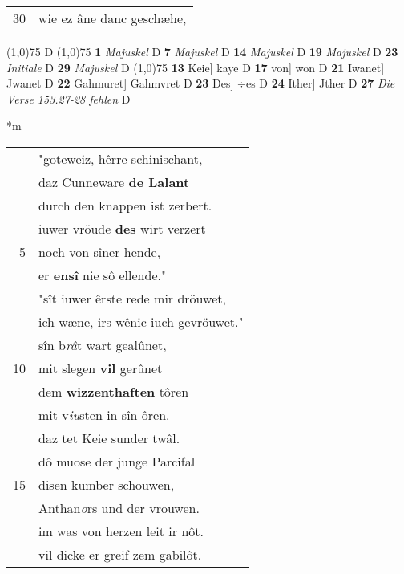 \documentclass[8pt,a4paper,notitlepage]{article}
\begin{document}
\begin{table}[ht]
\begin{minipage}[t]{0.5\linewidth}
\begin{tabular}{rl}
30 & wie ez âne danc geschæhe,\\ 
\end{tabular}
\scriptsize
\line(1,0){75} \newline
D \newline
\line(1,0){75} \newline
\textbf{1} \textit{Majuskel} D  \textbf{7} \textit{Majuskel} D  \textbf{14} \textit{Majuskel} D  \textbf{19} \textit{Majuskel} D  \textbf{23} \textit{Initiale} D  \textbf{29} \textit{Majuskel} D  \newline
\line(1,0){75} \newline
\textbf{13} Keie] kaye D \textbf{17} von] won D \textbf{21} Iwanet] Jwanet D \textbf{22} Gahmuret] Gahmvret D \textbf{23} Des] ÷es D \textbf{24} Ither] Jther D \textbf{27} \textit{Die Verse 153.27-28 fehlen} D  \newline
\end{minipage}
\hspace{0.5cm}
\begin{minipage}[t]{0.5\linewidth}
\small
\begin{center}*m
\end{center}
\begin{tabular}{rl}
 & "goteweiz, hêrre schinischant,\\ 
 & daz Cunneware \textbf{de Lalant}\\ 
 & durch den knappen ist zerbert.\\ 
 & iuwer vröude \textbf{des} wirt verzert\\ 
5 & noch von sîner hende,\\ 
 & er \textbf{en}\textbf{sî} nie sô ellende."\\ 
 & "sît iuwer êrste rede mir dröuwet,\\ 
 & ich wæne, irs wênic iuch gevröuwet."\\ 
 & sîn b\textit{râ}t wart gealûnet,\\ 
10 & mit slegen \textbf{vil} gerûnet\\ 
 & dem \textbf{wizzenthaften} tôren\\ 
 & mit v\textit{iu}sten in sîn ôren.\\ 
 & daz tet Keie sunder twâl.\\ 
 & dô muose der junge Parcifal\\ 
15 & disen kumber schouwen,\\ 
 & Anthan\textit{o}rs und der vrouwen.\\ 
 & im was von herzen leit ir nôt.\\ 
 & vil dicke er greif zem gabilôt.\\ 

\end{tabular}
\end{minipage}
\end{table}
\end{document}
